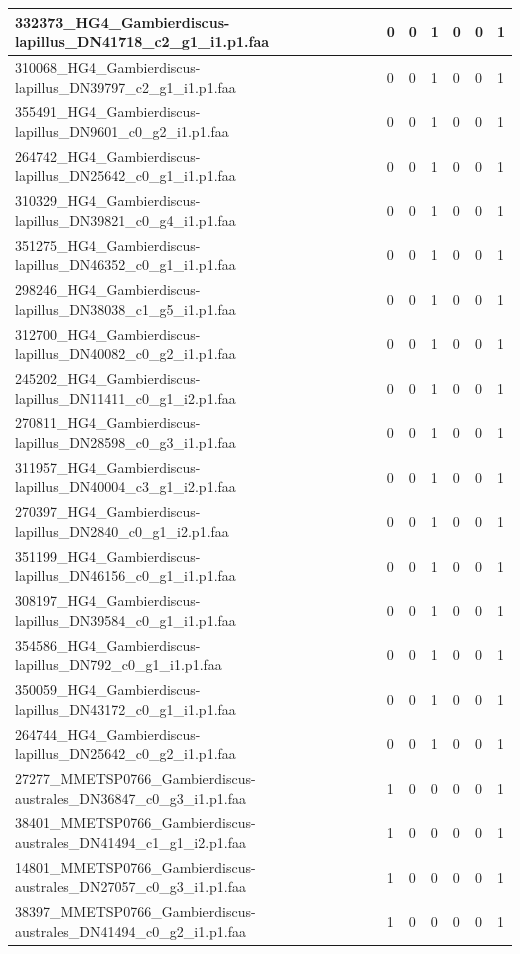 \documentclass[12pt]{article}
\begin{document}
\begin{longtable}{ | p{2cm} | p{2cm} |p{2.5cm} | p{2cm} | p{2.5cm} |  p{2cm} | p{2cm} |}
 \hline 
332373\_HG4\_Gambierdiscus-lapillus\_DN41718\_c2\_g1\_i1.p1.faa&0&0&1&0&0&1\\ 
 \hline 
310068\_HG4\_Gambierdiscus-lapillus\_DN39797\_c2\_g1\_i1.p1.faa&0&0&1&0&0&1\\ 
 \hline 
355491\_HG4\_Gambierdiscus-lapillus\_DN9601\_c0\_g2\_i1.p1.faa&0&0&1&0&0&1\\ 
 \hline 
264742\_HG4\_Gambierdiscus-lapillus\_DN25642\_c0\_g1\_i1.p1.faa&0&0&1&0&0&1\\ 
 \hline 
310329\_HG4\_Gambierdiscus-lapillus\_DN39821\_c0\_g4\_i1.p1.faa&0&0&1&0&0&1\\ 
 \hline 
351275\_HG4\_Gambierdiscus-lapillus\_DN46352\_c0\_g1\_i1.p1.faa&0&0&1&0&0&1\\ 
 \hline 
298246\_HG4\_Gambierdiscus-lapillus\_DN38038\_c1\_g5\_i1.p1.faa&0&0&1&0&0&1\\ 
 \hline 
312700\_HG4\_Gambierdiscus-lapillus\_DN40082\_c0\_g2\_i1.p1.faa&0&0&1&0&0&1\\ 
 \hline 
245202\_HG4\_Gambierdiscus-lapillus\_DN11411\_c0\_g1\_i2.p1.faa&0&0&1&0&0&1\\ 
 \hline 
270811\_HG4\_Gambierdiscus-lapillus\_DN28598\_c0\_g3\_i1.p1.faa&0&0&1&0&0&1\\ 
 \hline 
311957\_HG4\_Gambierdiscus-lapillus\_DN40004\_c3\_g1\_i2.p1.faa&0&0&1&0&0&1\\ 
 \hline 
270397\_HG4\_Gambierdiscus-lapillus\_DN2840\_c0\_g1\_i2.p1.faa&0&0&1&0&0&1\\ 
 \hline 
351199\_HG4\_Gambierdiscus-lapillus\_DN46156\_c0\_g1\_i1.p1.faa&0&0&1&0&0&1\\ 
 \hline 
308197\_HG4\_Gambierdiscus-lapillus\_DN39584\_c0\_g1\_i1.p1.faa&0&0&1&0&0&1\\ 
 \hline 
354586\_HG4\_Gambierdiscus-lapillus\_DN792\_c0\_g1\_i1.p1.faa&0&0&1&0&0&1\\ 
 \hline 
350059\_HG4\_Gambierdiscus-lapillus\_DN43172\_c0\_g1\_i1.p1.faa&0&0&1&0&0&1\\ 
 \hline 
264744\_HG4\_Gambierdiscus-lapillus\_DN25642\_c0\_g2\_i1.p1.faa&0&0&1&0&0&1\\ 
 \hline 
27277\_MMETSP0766\_Gambierdiscus-australes\_DN36847\_c0\_g3\_i1.p1.faa&1&0&0&0&0&1\\ 
 \hline 
38401\_MMETSP0766\_Gambierdiscus-australes\_DN41494\_c1\_g1\_i2.p1.faa&1&0&0&0&0&1\\ 
 \hline 
14801\_MMETSP0766\_Gambierdiscus-australes\_DN27057\_c0\_g3\_i1.p1.faa&1&0&0&0&0&1\\ 
 \hline 
38397\_MMETSP0766\_Gambierdiscus-australes\_DN41494\_c0\_g2\_i1.p1.faa&1&0&0&0&0&1\\ 

\end{longtable}
\end{document}
